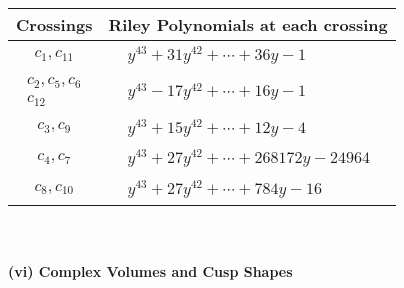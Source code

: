 \documentclass[1p]{elsarticle_modified}
\theoremstyle{definition}
\begin{document}
\begin{tabular}{m{50pt}|m{274pt}}
Crossings & \hspace{64pt}Riley Polynomials at each crossing \\
\hline $$\begin{aligned}c_{1},c_{11}\end{aligned}$$&$\begin{aligned}
&y^{43}+31 y^{42}+\cdots+36 y-1
\end{aligned}$\\
\hline $$\begin{aligned}c_{2},c_{5},c_{6}\\c_{12}\end{aligned}$$&$\begin{aligned}
&y^{43}-17 y^{42}+\cdots+16 y-1
\end{aligned}$\\
\hline $$\begin{aligned}c_{3},c_{9}\end{aligned}$$&$\begin{aligned}
&y^{43}+15 y^{42}+\cdots+12 y-4
\end{aligned}$\\
\hline $$\begin{aligned}c_{4},c_{7}\end{aligned}$$&$\begin{aligned}
&y^{43}+27 y^{42}+\cdots+268172 y-24964
\end{aligned}$\\
\hline $$\begin{aligned}c_{8},c_{10}\end{aligned}$$&$\begin{aligned}
&y^{43}+27 y^{42}+\cdots+784 y-16
\end{aligned}$\\
\hline
\end{tabular}\\~\\
\newpage\flushleft \textbf{(vi) Complex Volumes and Cusp Shapes}
\end{document}
